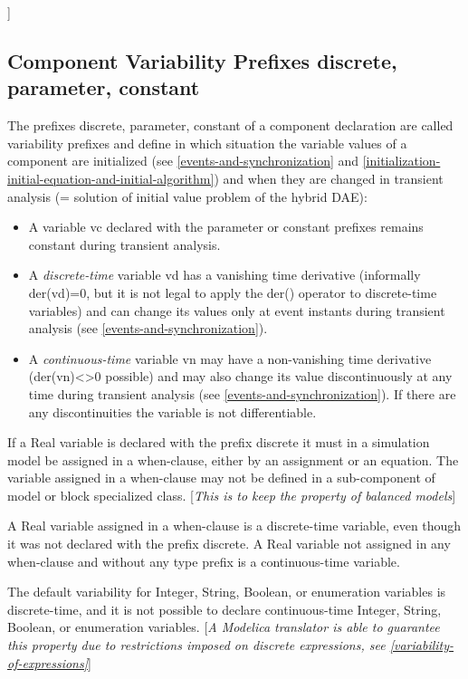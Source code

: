 \documentclass[10pt,a4paper]{report}
\def\doublelabel#1{\label{#1}}
\begin{document}
{]}

\subsection{Component Variability Prefixes discrete, parameter, constant}\doublelabel{component-variability-prefixes-discrete-parameter-constant}

The prefixes discrete, parameter, constant of a component declaration
are called variability prefixes and define in which situation the
variable values of a component are initialized (see \ref{events-and-synchronization} and
\ref{initialization-initial-equation-and-initial-algorithm}) and when they are changed in transient analysis (= solution
of initial value problem of the hybrid DAE):

\begin{itemize}
\item
  A variable vc declared with the parameter or constant prefixes remains
  constant during transient analysis.
\item
  A \emph{discrete-time} variable vd has a vanishing time derivative
  (informally der(vd)=0, but it is not legal to apply the der() operator
  to discrete-time variables) and can change its values only at event
  instants during transient analysis (see \ref{events-and-synchronization}).
\item
  A \emph{continuous-time} variable vn may have a non-vanishing time
  derivative (der(vn)\textless{}\textgreater{}0 possible) and may also
  change its value discontinuously at any time during transient analysis
  (see \ref{events-and-synchronization}). If there are any discontinuities the variable is
  not differentiable.
\end{itemize}

If a Real variable is declared with the prefix discrete it must in a
simulation model be assigned in a when-clause, either by an assignment
or an equation. The variable assigned in a when-clause may not be
defined in a sub-component of model or block specialized class.
{[}\emph{This is to keep the property of balanced models}{]}

A Real variable assigned in a when-clause is a discrete-time variable,
even though it was not declared with the prefix discrete. A Real
variable not assigned in any when-clause and without any type prefix is
a continuous-time variable.

The default variability for Integer, String, Boolean, or enumeration
variables is discrete-time, and it is not possible to declare
continuous-time Integer, String, Boolean, or enumeration variables.
{[}\emph{A Modelica translator is able to guarantee this property due to
restrictions imposed on discrete expressions, see \ref{variability-of-expressions}}{]}
\end{document}
